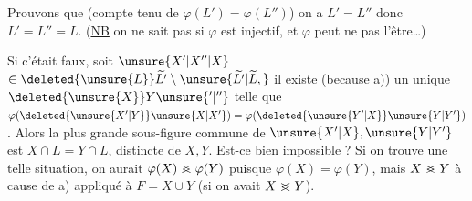 Prouvons que (compte tenu de $\varphi(L')=\varphi(L'')$) on a $L'=L''$ donc $L'=L''=L$. (\uline{NB} on ne sait pas si $\varphi$ est injectif, et $\varphi$ peut ne pas l'être\ldots)

Si c'était faux, soit $\unsure{X'|X''|X}$  $\in\deleted{\unsure{L}}\widetilde{L'}\setminus\unsure{\widetilde{L'}|\widetilde L,}$ il existe (because a)) un unique $\deleted{\unsure{X}}Y\unsure{^{\prime}|^{\prime\prime}}$  telle que $\varphi(\deleted{\unsure{X'|Y}}\unsure{X|X'})=\varphi(\deleted{\unsure{Y'|X}}\unsure{Y|Y'})$. Alors la plus grande sous-figure commune de $\unsure{X'|X},\unsure{Y|Y'}$ est $X\cap L=Y\cap L$, distincte de $X,Y$. Est-ce bien impossible ? Si on trouve une telle situation, on aurait $\varphi(X)\mathrel{>\mkern-13mu<}\varphi(Y)$ puisque $\varphi(X)=\varphi(Y)$, mais $X\mathrel{>\mkern-13mu<}Y$ à cause de a) appliqué à  $F=X\cup Y$ (si on avait $X\mathrel{>\mkern-13mu<}Y$).
